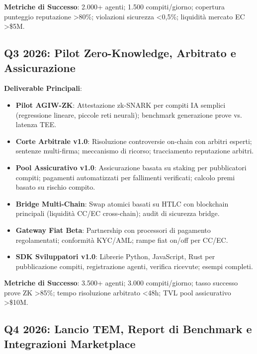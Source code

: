 \documentclass[11pt]{article}
\begin{document}
\begin{itemize}[noitemsep]
\textbf{Metriche di Successo}: 2.000+ agenti; 1.500 compiti/giorno; copertura punteggio reputazione >80\%; violazioni sicurezza <0,5\%; liquidità mercato EC >\$5M.

\subsection{Q3 2026: Pilot Zero-Knowledge, Arbitrato e Assicurazione}

\textbf{Deliverable Principali}:
\begin{itemize}[noitemsep]
  \item \textbf{Pilot AGIW-ZK}: Attestazione zk-SNARK per compiti IA semplici (regressione lineare, piccole reti neurali); benchmark generazione prove vs. latenza TEE.
  \item \textbf{Corte Arbitrale v1.0}: Risoluzione controversie on-chain con arbitri esperti; sentenze multi-firma; meccanismo di ricorso; tracciamento reputazione arbitri.
  \item \textbf{Pool Assicurativo v1.0}: Assicurazione basata su staking per pubblicatori compiti; pagamenti automatizzati per fallimenti verificati; calcolo premi basato su rischio compito.
  \item \textbf{Bridge Multi-Chain}: Swap atomici basati su HTLC con blockchain principali (liquidità CC/EC cross-chain); audit di sicurezza bridge.
  \item \textbf{Gateway Fiat Beta}: Partnership con processori di pagamento regolamentati; conformità KYC/AML; rampe fiat on/off per CC/EC.
  \item \textbf{SDK Sviluppatori v1.0}: Librerie Python, JavaScript, Rust per pubblicazione compiti, registrazione agenti, verifica ricevute; esempi completi.
\end{itemize}

\textbf{Metriche di Successo}: 3.500+ agenti; 3.000 compiti/giorno; tasso successo prove ZK >85\%; tempo risoluzione arbitrato <48h; TVL pool assicurativo >\$10M.

\subsection{Q4 2026: Lancio TEM, Report di Benchmark e Integrazioni Marketplace}


\end{itemize}
\end{document}
